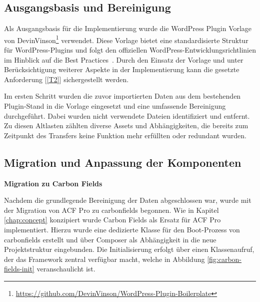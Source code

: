 \subsection{Ausgangsbasis und Bereinigung}

Als Ausgangsbasis für die Implementierung wurde die WordPress Plugin Vorlage von DevinVinson\footnote{\url{https://github.com/DevinVinson/WordPress-Plugin-Boilerplate}} verwendet.
Diese Vorlage bietet eine standardisierte Struktur für WordPress-Plugins und folgt den offiziellen WordPress-Entwicklungsrichtlinien im Hinblick auf die Best Practices~\cite{wordpress2025BSP}.
Durch den Einsatz der Vorlage und unter Berücksichtigung weiterer Aspekte in der Implementierung kann die gesetzte Anforderung [\ref{T2}] sichergestellt werden.

Im ersten Schritt wurden die zuvor importierten Daten aus dem bestehenden Plugin-Stand in die Vorlage eingesetzt und eine umfassende Bereinigung durchgeführt.
Dabei wurden nicht verwendete Dateien identifiziert und entfernt.
Zu diesen Altlasten zählten diverse Assets und Abhängigkeiten, die bereits zum Zeitpunkt des Transfers keine Funktion mehr erfüllten oder redundant wurden.
\subsection{Migration und Anpassung der Komponenten}
\textbf{Migration zu Carbon Fields}

Nachdem die grundlegende Bereinigung der Daten abgeschlossen war, wurde mit der Migration von ACF Pro zu \gls{carbonfields} begonnen.
Wie in Kapitel \ref{chap:concept} konzipiert wurde Carbon Fields als Ersatz für ACF Pro implementiert.
Hierzu wurde eine dedizierte Klasse für den Boot-Prozess von \gls{carbonfields} erstellt und über Composer als Abhängigkeit in die neue Projektstruktur eingebunden.
Die Initialisierung erfolgt über einen Klassenaufruf, der das Framework zentral verfügbar macht, welche in Abbildung \ref{fig:carbon-fields-init} veranschaulicht ist.

